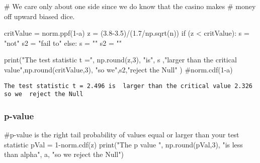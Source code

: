 \documentclass[
  letterpaper,
  DIV=11,
  numbers=noendperiod]{scrreprt}
\newenvironment{Shaded}{\begin{snugshade}}{\end{snugshade}}
\newcommand{\BuiltInTok}[1]{\textcolor[rgb]{0.00,0.23,0.31}{#1}}
\newcommand{\CommentTok}[1]{\textcolor[rgb]{0.37,0.37,0.37}{#1}}
\newcommand{\ControlFlowTok}[1]{\textcolor[rgb]{0.00,0.23,0.31}{#1}}
\newcommand{\DecValTok}[1]{\textcolor[rgb]{0.68,0.00,0.00}{#1}}
\newcommand{\FloatTok}[1]{\textcolor[rgb]{0.68,0.00,0.00}{#1}}
\newcommand{\NormalTok}[1]{\textcolor[rgb]{0.00,0.23,0.31}{#1}}
\newcommand{\OperatorTok}[1]{\textcolor[rgb]{0.37,0.37,0.37}{#1}}
\newcommand{\StringTok}[1]{\textcolor[rgb]{0.13,0.47,0.30}{#1}}
\begin{document}
\begin{Shaded}
\begin{Highlighting}[]
\CommentTok{\# We care only about one side since we do know that the casino makes }
\CommentTok{\# money off upward biased dice.}

\NormalTok{critValue }\OperatorTok{=}\NormalTok{ norm.ppf(}\DecValTok{1}\OperatorTok{{-}}\NormalTok{a)}
\NormalTok{z }\OperatorTok{=}\NormalTok{ (}\FloatTok{3.8}\OperatorTok{{-}}\FloatTok{3.5}\NormalTok{)}\OperatorTok{/}\NormalTok{(}\FloatTok{1.7}\OperatorTok{/}\NormalTok{np.sqrt(n))}
\ControlFlowTok{if}\NormalTok{ (z }\OperatorTok{\textless{}}\NormalTok{ critValue):}
\NormalTok{    s }\OperatorTok{=} \StringTok{"not"}
\NormalTok{    s2 }\OperatorTok{=} \StringTok{"fail to"}
\ControlFlowTok{else}\NormalTok{:}
\NormalTok{    s }\OperatorTok{=} \StringTok{""}   
\NormalTok{    s2 }\OperatorTok{=} \StringTok{""}
    
\BuiltInTok{print}\NormalTok{(}\StringTok{"The test statistic t ="}\NormalTok{, np.}\BuiltInTok{round}\NormalTok{(z,}\DecValTok{3}\NormalTok{), }\StringTok{"is"}\NormalTok{, s ,}\StringTok{"larger than the critical value"}\NormalTok{,np.}\BuiltInTok{round}\NormalTok{(critValue,}\DecValTok{3}\NormalTok{), }\StringTok{"so we"}\NormalTok{,s2,}\StringTok{"reject the Null"}\NormalTok{ ) }
\CommentTok{\#norm.cdf(1{-}a)}
\end{Highlighting}
\end{Shaded}

\begin{verbatim}
The test statistic t = 2.496 is  larger than the critical value 2.326 so we  reject the Null
\end{verbatim}

\hypertarget{p-value}{%
\subsubsection{p-value}\label{p-value}}

\begin{Shaded}
\begin{Highlighting}[]
\CommentTok{\#p{-}value is the right tail probability of values equal or larger than your test statistic}
\NormalTok{pVal }\OperatorTok{=} \DecValTok{1}\OperatorTok{{-}}\NormalTok{norm.cdf(z)}
\BuiltInTok{print}\NormalTok{(}\StringTok{"The p value "}\NormalTok{, np.}\BuiltInTok{round}\NormalTok{(pVal,}\DecValTok{3}\NormalTok{), }\StringTok{"is less than alpha"}\NormalTok{, a, }\StringTok{"so we reject the Null"}\NormalTok{)}
\end{Highlighting}
\end{Shaded}
\end{document}
